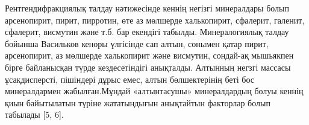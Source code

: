 % 
% 
% 
% 
% 

Рентгендифракциялық талдау нәтижесінде кеннің негізгі минералдары болып
арсенопирит, пирит, пирротин, өте аз мөлшерде халькопирит, сфалерит,
галенит, сфалерит, висмутин және т.б. бар екендігі табылды.
Минералогиялық талдау бойынша Васильков кеноры үлгісінде сап алтын,
сонымен қатар пирит, арсенопирит, аз мөлшерде халькопирит және висмутин,
сондай-ақ мышьякпен бірге байланысқан түрде кездесетіндігі анықталды.
Алтынның негзгі массасы ұсақдисперсті, пішіндері дұрыс емес, алтын
бөлшектерінің беті бос минералдармен жабылған.Мұндай «алтынтасушы»
минералдардың болуы кеннің қиын байытылатын түріне жататындығын
анықтайтын факторлар болып табылады {[}5, 6{]}.


